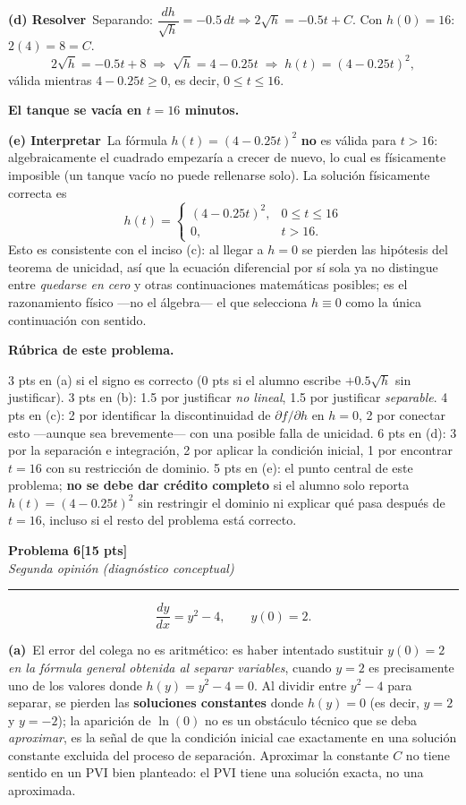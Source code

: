 \documentclass[11pt,letterpaper]{article}
\newcommand{\problema}[3]{%
  \bigskip\bigskip\noindent
  {\Large\textbf{Problema #1}}\hfill\textbf{[#2 pts]}\\[3pt]
  {\small\itshape #3}\par
  \vspace{2pt}\hrule\vspace{8pt}
}
\newcommand{\subparte}[2]{%
  \medskip\noindent\textbf{(#1}\ #2\par\smallskip
}
\newenvironment{resultado}
  {\begin{mdframed}[linecolor=black,linewidth=0.6pt,
    innerleftmargin=6pt,innerrightmargin=6pt,innertopmargin=4pt,innerbottommargin=4pt]
   \bfseries}
  {\end{mdframed}}
\newenvironment{rubrica}{%
  \begin{mdframed}[linecolor=black,linewidth=0.6pt,
    innerleftmargin=8pt,innerrightmargin=8pt,innertopmargin=5pt,innerbottommargin=5pt]
  \small\textbf{Rúbrica de este problema.}\par\smallskip
}{\end{mdframed}}
\begin{document}
\subparte{d) Resolver}{Separando: $\dfrac{dh}{\sqrt h} = -0.5\,dt \Rightarrow 2\sqrt h = -0.5t + C$. Con $h(0)=16$: $2(4)=8=C$.
\[
2\sqrt{h} = -0.5t + 8 \;\Longrightarrow\; \sqrt{h} = 4-0.25t \;\Longrightarrow\; h(t) = (4-0.25t)^2,
\]
válida mientras $4-0.25t \geq 0$, es decir, $0\le t\le 16$.
\begin{resultado}
El tanque se vacía en $t=16$ minutos.
\end{resultado}}

\subparte{e) Interpretar}{La fórmula $h(t)=(4-0.25t)^2$ \textbf{no} es válida para $t>16$: algebraicamente el cuadrado empezaría a crecer de nuevo, lo cual es físicamente imposible (un tanque vacío no puede rellenarse solo). La solución físicamente correcta es
\[
h(t) = \begin{cases} (4-0.25t)^2, & 0 \le t \le 16 \\ 0, & t > 16. \end{cases}
\]
Esto es consistente con el inciso (c): al llegar a $h=0$ se pierden las hipótesis del teorema de unicidad, así que la ecuación diferencial por sí sola ya no distingue entre \emph{quedarse en cero} y otras continuaciones matemáticas posibles; es el razonamiento físico —no el álgebra— el que selecciona $h\equiv0$ como la única continuación con sentido.}

\begin{rubrica}
3 pts en (a) si el signo es correcto (0 pts si el alumno escribe $+0.5\sqrt h$ sin justificar). 3 pts en (b): 1.5 por justificar \emph{no lineal}, 1.5 por justificar \emph{separable}. 4 pts en (c): 2 por identificar la discontinuidad de $\partial f/\partial h$ en $h=0$, 2 por conectar esto —aunque sea brevemente— con una posible falla de unicidad. 6 pts en (d): 3 por la separación e integración, 2 por aplicar la condición inicial, 1 por encontrar $t=16$ con su restricción de dominio. 5 pts en (e): el punto central de este problema; \textbf{no se debe dar crédito completo} si el alumno solo reporta $h(t)=(4-0.25t)^2$ sin restringir el dominio ni explicar qué pasa después de $t=16$, incluso si el resto del problema está correcto.
\end{rubrica}

\newpage
\problema{6}{15}{Segunda opinión (diagnóstico conceptual)}

\[
\frac{dy}{dx} = y^2-4, \qquad y(0)=2.
\]

\subparte{a)}{El error del colega no es aritmético: es haber intentado sustituir $y(0)=2$ \emph{en la fórmula general obtenida al separar variables}, cuando $y=2$ es precisamente uno de los valores donde $h(y)=y^2-4=0$. Al dividir entre $y^2-4$ para separar, se pierden las \textbf{soluciones constantes} donde $h(y)=0$ (es decir, $y=2$ y $y=-2$); la aparición de $\ln(0)$ no es un obstáculo técnico que se deba \emph{aproximar}, es la señal de que la condición inicial cae exactamente en una solución constante excluida del proceso de separación. Aproximar la constante $C$ no tiene sentido en un PVI bien planteado: el PVI tiene una solución exacta, no una aproximada.}
\end{document}
